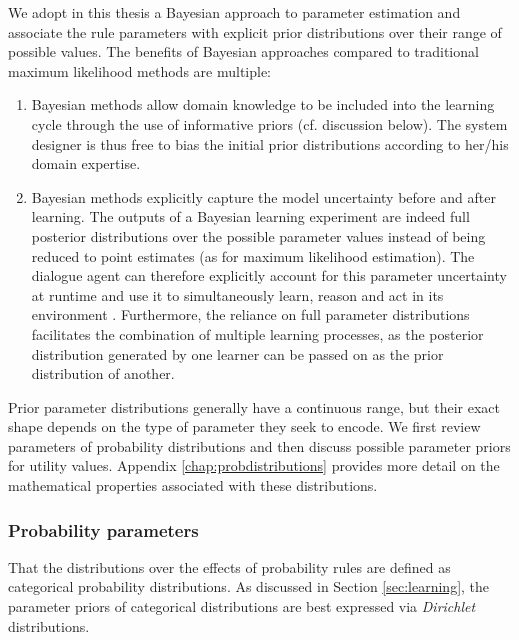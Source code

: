We adopt in this thesis a Bayesian approach to parameter estimation and associate the rule parameters with explicit prior distributions over their range of possible values.  The benefits of Bayesian approaches compared to traditional maximum likelihood methods are multiple:
\begin{enumerate} 
\item Bayesian methods allow domain knowledge to be included into the learning cycle through the use of informative priors (cf. discussion below). The system designer is thus free to bias the initial prior distributions according to her/his domain expertise.
\item Bayesian methods explicitly capture the model uncertainty before and after learning.  The outputs of a Bayesian learning experiment are indeed full posterior distributions over the possible parameter values instead of being reduced to point estimates (as for maximum likelihood estimation).  The dialogue agent can therefore explicitly account for this parameter uncertainty at runtime and use it to simultaneously learn, reason and act in its environment \citep{Ross:2011}. Furthermore, the reliance on full parameter distributions facilitates the combination of multiple learning processes, as the posterior distribution generated by one learner can be passed on as the prior distribution of another. 
\end{enumerate}

Prior parameter distributions generally have a continuous range, but their exact shape depends on the type of parameter they seek to encode. We first review parameters of probability distributions and then discuss possible parameter priors for utility values.  Appendix \ref{chap:probdistributions} provides more detail on the mathematical properties associated with these distributions.

\subsubsection*{Probability parameters}

That the distributions over the effects of probability rules are defined as categorical probability distributions.  As discussed in Section \ref{sec:learning}, the parameter priors of categorical distributions are best expressed via \textit{Dirichlet} distributions. 

